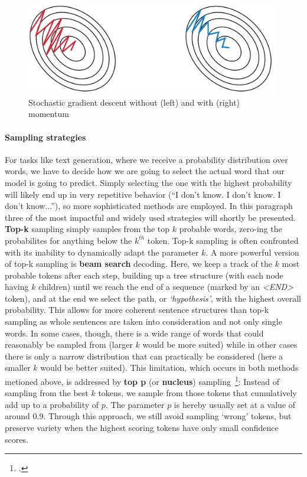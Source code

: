 \begin{figure}
	\includegraphics[height=4cm]{img/momentum}
	\caption{Stochastic gradient descent without (left) and with (right) momentum}
	\label{fig:momentum}
\end{figure}

\paragraph{Sampling strategies}
For tasks like text generation, where we receive a probability distribution over words, we have to decide how we are going to select the actual word that our model is going to predict. Simply selecting the one with the highest probability will likely end up in very repetitive behavior (``I don't know. I don't know. I don't know...''), so more sophisticated methods are employed. In this paragraph three of the most impactful and widely used strategies will shortly be presented. \textbf{Top-k} sampling simply samples from the top $ k $ probable words, zero-ing the probabilites for anything below the $ k^{th} $ token. Top-k sampling is often confronted with its inability to dynamically adapt the parameter $ k $. A more powerful version of top-k sampling is \textbf{beam search} decoding. Here, we keep a track of the $ k $ most probable tokens after each step, building up a tree structure (with each node having $ k $ children) until we reach the end of a sequence (marked by an \textit{<END>} token), and at the end we select the path, or \textit{`hypothesis'}, with the highest overall probability. This allows for more coherent sentence structures than top-k sampling as whole sentences are taken into consideration and not only single words. In some cases, though, there is a wide range of words that could reasonably be sampled from (larger $ k $ would be more suited) while in other cases there is only a narrow distribution that can practically be considered (here a smaller $ k $ would be better suited). This limitation, which occurs in both methods metioned above, is addressed by \textbf{top p} (or \textbf{nucleus}) sampling~\footcite{DBLP:journals/corr/abs-1904-09751}: Instead of sampling from the best $ k $ tokens, we sample from those tokens that cumulatively add up to a probability of $ p $. The parameter $ p $ is hereby usually set at a value of around $ 0.9 $. Through this approach, we still avoid sampling `wrong' tokens, but preserve variety when the highest scoring tokens have only small confidence scores.

